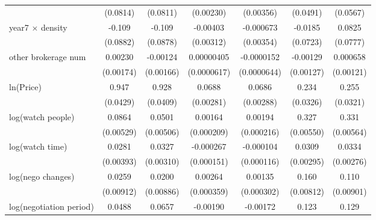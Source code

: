 {\begin{tabular}{l*{6}{c}}
            &    (0.0814)         &    (0.0811)         &   (0.00230)         &   (0.00356)         &    (0.0491)         &    (0.0567)         \\
\addlinespace
year7 $\times$ density&      -0.109         &      -0.109         &    -0.00403         &   -0.000673         &     -0.0185         &      0.0825         \\
            &    (0.0882)         &    (0.0878)         &   (0.00312)         &   (0.00354)         &    (0.0723)         &    (0.0777)         \\
\addlinespace
other brokerage num  &     0.00230         &    -0.00124         &  0.00000405         &  -0.0000152         &    -0.00129         &    0.000658         \\
            &   (0.00174)         &   (0.00166)         & (0.0000617)         & (0.0000644)         &   (0.00127)         &   (0.00121)         \\
\addlinespace
ln(Price)&       0.947\sym{***}&       0.928\sym{***}&      0.0688\sym{***}&      0.0686\sym{***}&       0.234\sym{***}&       0.255\sym{***}\\
            &    (0.0429)         &    (0.0409)         &   (0.00281)         &   (0.00288)         &    (0.0326)         &    (0.0321)         \\
\addlinespace
log(watch people)&      0.0864\sym{***}&      0.0501\sym{***}&     0.00164\sym{***}&     0.00194\sym{***}&       0.327\sym{***}&       0.331\sym{***}\\
            &   (0.00529)         &   (0.00506)         &  (0.000209)         &  (0.000216)         &   (0.00550)         &   (0.00564)         \\
\addlinespace
log(watch time)&      0.0281\sym{***}&      0.0327\sym{***}&   -0.000267\sym{*}  &   -0.000104         &      0.0309\sym{***}&      0.0334\sym{***}\\
            &   (0.00393)         &   (0.00310)         &  (0.000151)         &  (0.000116)         &   (0.00295)         &   (0.00276)         \\
\addlinespace
log(nego changes)&      0.0259\sym{***}&      0.0200\sym{**} &     0.00264\sym{***}&     0.00135\sym{***}&       0.160\sym{***}&       0.110\sym{***}\\
            &   (0.00912)         &   (0.00886)         &  (0.000359)         &  (0.000302)         &   (0.00812)         &   (0.00901)         \\
\addlinespace
log(negotiation period)&      0.0488\sym{***}&      0.0657\sym{***}&    -0.00190\sym{***}&    -0.00172\sym{***}&       0.123\sym{***}&       0.129\sym{***}\\

\end{tabular}}

